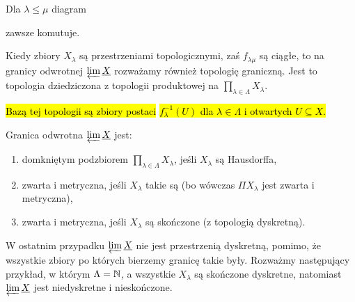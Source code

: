 Dla $\lambda\leq\mu$ diagram 
\begin{center}
\end{center}
zawsze komutuje.


Kiedy zbiory $X_\lambda$ są przestrzeniami topologicznymi, zaś $f_{\lambda\mu}$ są ciągłe, to na granicy odwrotnej $\varprojlim\underline{X}$ rozważamy również topologię graniczną. Jest to topologia dziedziczona z topologii produktowej na $\prod_{\lambda\in\Lambda}X_\lambda$. 

\hl{Bazą tej topologii są zbiory postaci }\hl{$f_\lambda^{-1}(U)$ dla $\lambda\in\Lambda$ i otwartych $U\subseteq X$.}

\begin{fact}{}{}
  Granica odwrotna $\varprojlim\underline{X}$ jest:
  \begin{enumerate}
    \item domkniętym podzbiorem $\prod_{\lambda\in\Lambda}X_\lambda$, jeśli $X_\lambda$ są Hausdorffa,
    \item zwarta i metryczna, jeśli $X_\lambda$ takie są (bo wówczas $\Pi X_\lambda$ jest zwarta i metryczna),
    \item %
      zwarta i metryczna, jeśli $X_\lambda$ są skończone (z topologią dyskretną).
  \end{enumerate}
\end{fact}

W ostatnim przypadku $\varprojlim \underline{X}$ nie jest przestrzenią dyskretną, pomimo, że wszystkie zbiory po których bierzemy granicę takie były. Rozważmy następujący przykład, w którym $\Lambda=\mathbb{N}$, a wszystkie $X_\lambda$ są skończone dyskretne, natomiast $\varprojlim \underline{X}$ jest niedyskretne i nieskończone.


